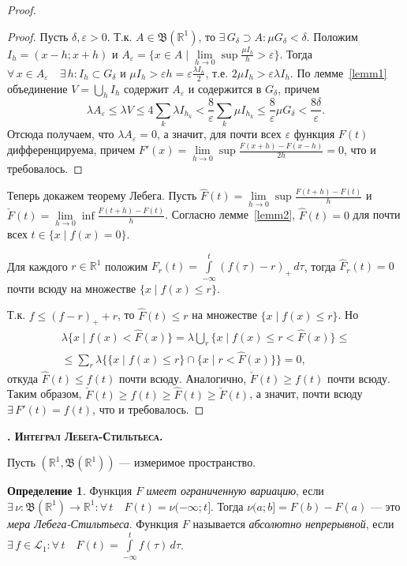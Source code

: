 \documentclass[12pt,titlepage]{article}
\newcounter{tema}
\renewcommand{\thetema}{\arabic{tema}}
\newcommand*{\tema}[1]{\vspace{10pt}
\begin{center}{\textbf{\refstepcounter{tema}
\textsc{\thetema. #1.}}}\vspace{7pt}
\end{center}}
\theoremstyle{definition}
\newtheorem{defen}{Определение}[tema]
\begin{document}
\begin{proof}
\begin{proof}
Пусть $\delta,\varepsilon>0$. Т.к. $A\in\mathfrak{B}(\mathbb{R}^1)$,
то $\exists\,G_\delta\supset A:\mu G_\delta<\delta$. Положим
$I_h=(x-h;x+h)$ и $A_\varepsilon=\{x\in A\mid \lim\limits_{h\to
0}\sup\frac{\mu I_h}{h}>\varepsilon\}$. Тогда $\forall\,x\in
A_\varepsilon\quad\exists\,h:I_h\subset G_\delta$ и $\mu
I_h>\varepsilon h=\varepsilon\frac{\lambda I_h}{2}$, т.е. $2\mu
I_h>\varepsilon\lambda I_h$. По лемме~\ref{lemm1} объединение
$V=\bigcup\limits_h I_h$ содержит $A_\varepsilon$ и содержится в
$G_\delta$, причем $$\lambda A_\varepsilon\leqslant\lambda
V\leqslant 4\sum\limits_k\lambda I_{h_k}<\frac{8}{\varepsilon}
\sum\limits_k\mu I_{h_k}\leqslant\frac{8}{\varepsilon}\mu
G_\delta<\frac{8\delta}{\varepsilon}.$$ Отсюда получаем, что
$\lambda A_\varepsilon=0$, а значит, для почти всех $\varepsilon$
функция $F(t)$ дифференцируема, причем $F'(x)=\lim\limits_{h\to
0}\sup\frac{F(x+h)-F(x-h)}{2h}=0$, что и требовалось.
\end{proof}

Теперь докажем теорему Лебега. Пусть $\hat{F}(t)=\lim\limits_{h\to
0}\sup\frac{F(t+h)-F(t)}{h}$ и $\check{F}(t)=\lim\limits_{h\to
0}\inf\frac{F(t+h)-F(t)}{h}$. Согласно лемме~\ref{lemm2},
$\hat{F}(t)=0$ для почти всех $t\in\{x\mid f(x)=0\}$.

Для каждого $r\in\mathbb{R}^1$ положим
$F_r(t)=\int\limits_{-\infty}^t\!(f(\tau)-r)_+\,d\tau$, тогда
$\hat{F}_r(t)=0$ почти всюду на множестве $\{x\mid f(x)\leqslant
r\}$.

Т.к. $f\leqslant (f-r)_++r$, то $\hat{F}(t)\leqslant r$ на множестве
$\{x\mid f(x)\leqslant r\}$. Но
\begin{multline*}
\lambda\{x\mid f(x)<\hat{F}(x)\}=\lambda\bigcup\limits_r\{x\mid
f(x)\leqslant r< \hat{F}(x)\}\leqslant\\
\leqslant\sum\limits_r\lambda\{\{x\mid f(x)\leqslant r\}\cap\{x\mid
r<\hat{F}(x)\}\}=0,
\end{multline*}
откуда $\hat{F}(t)\leqslant f(t)$ почти всюду. Аналогично,
$\check{F}(t)\geqslant f(t)$ почти всюду. Таким образом,
$\check{F}(t)\geqslant
f(t)\geqslant\hat{F}(t)\geqslant\check{F}(t)$, а значит, почти всюду
$\exists\,F'(t)=f(t)$, что и требовалось.
\end{proof}

\tema{Интеграл Лебега-Стильтьеса}

Пусть $(\mathbb{R}^1,\mathfrak{B}(\mathbb{R}^1))$ --- измеримое
пространство.

\begin{defen}
Функция $F$ \emph{имеет ограниченную вариацию}, если
$\exists\,\nu\colon
\mathfrak{B}(\mathbb{R}^1)\to\mathbb{R}^1:\forall\,t\quad
F(t)=\nu(-\infty;t]$. Тогда $\nu(a;b]=F(b)-F(a)$ --- это \emph{мера
Лебега-Стильтьеса}. Функция $F$ называется \emph{абсолютно
непрерывной}, если $\exists\,f\in\mathcal{L}_1:\forall\,t\quad
F(t)=\int\limits_{-\infty}^t\!f(\tau)\,d\tau$.
\end{defen}
\end{document}
